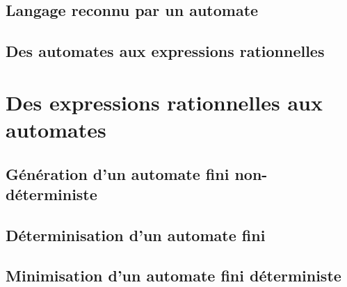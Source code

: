 \subsection{Langage reconnu par un automate}









\subsection{Des automates aux expressions rationnelles}







\section{Des expressions rationnelles aux automates}

\subsection{Génération d'un automate fini non-déterministe}







\subsection{Déterminisation d'un automate fini}





\subsection{Minimisation d'un automate fini déterministe}








 
